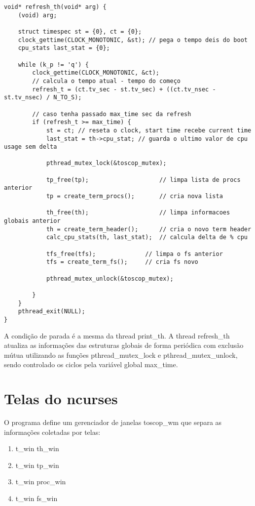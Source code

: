 \documentclass{article}
\begin{document}
\begin{verbatim}
void* refresh_th(void* arg) {
    (void) arg; 
    
    struct timespec st = {0}, ct = {0};
    clock_gettime(CLOCK_MONOTONIC, &st); // pega o tempo deis do boot 
    cpu_stats last_stat = {0}; 
 
    while (k_p != 'q') {
        clock_gettime(CLOCK_MONOTONIC, &ct); 
        // calcula o tempo atual - tempo do começo
        refresh_t = (ct.tv_sec - st.tv_sec) + ((ct.tv_nsec - st.tv_nsec) / N_TO_S); 

        // caso tenha passado max_time sec da refresh 
        if (refresh_t >= max_time) {
            st = ct; // reseta o clock, start time recebe current time 
            last_stat = th->cpu_stat; // guarda o ultimo valor de cpu usage sem delta 
      
            pthread_mutex_lock(&toscop_mutex);

            tp_free(tp);                    // limpa lista de procs anterior
            tp = create_term_procs();       // cria nova lista
          
            th_free(th);                    // limpa informacoes globais anterior
            th = create_term_header();      // cria o novo term header
            calc_cpu_stats(th, last_stat);  // calcula delta de % cpu

            tfs_free(tfs);              // limpa o fs anterior
            tfs = create_term_fs();     // cria fs novo

            pthread_mutex_unlock(&toscop_mutex);
        
        }
    } 
    pthread_exit(NULL);
}
\end{verbatim}

A condição de parada é a mesma da thread print\_th. A thread refresh\_th atualiza
as informações das estruturas globais de forma periódica com exclusão mútua
utilizando as funções pthread\_mutex\_lock e pthread\_mutex\_unlock,
sendo controlado os ciclos pela variável global max\_time.

\section{Telas do ncurses}
O programa define um gerenciador de janelas toscop\_wm que 
separa as informações coletadas por telas:
\begin{enumerate}
    \item t\_win th\_win 
    \item t\_win tp\_win  
    \item t\_win proc\_win 
    \item t\_win fs\_win
\end{enumerate}
\end{document}
